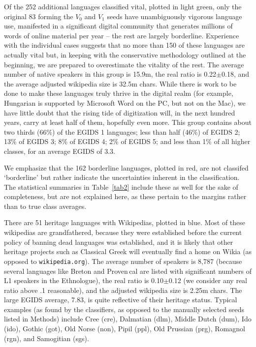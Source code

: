 \documentclass[10pt]{article}
\begin{document}
Of the 252 additional languages classified vital, plotted in light green, only
the original 83 forming the $V_0$ and $V_1$ seeds have unambiguously vigorous
language use, manifested in a significant digital community that generates
millions of words of online material per year -- the rest are largely
borderline. Experience with the individual cases suggests that no more than
150 of these languages are actually vital but, in keeping with the
conservative methodology outlined at the beginning, we are prepared to
overestimate the vitality of the rest.  The average number of native speakers
in this group is 15.9m, the real ratio is 0.22$\pm$0.18, and the average
adjusted wikipedia size is 32.5m chars.  While there is work to be done to
make these languages truly thrive in the digital realm (for example, Hungarian
is supported by Microsoft Word on the PC, but not on the Mac), we have little
doubt that the rising tide of digitization will, in the next hundred years,
carry at least half of them, hopefully even more. This group contains about
two thirds (66\%) of the EGIDS 1 languages; less than half (46\%) of EGIDS 2;
13\% of EGIDS 3; 8\% of EGIDS 4; 2\% of EGIDS 5; and less than 1\% of all
higher classes, for an average EGIDS of 3.3.

	

We emphasize that the 162 borderline languages, plotted in red, are not
classifed `borderline' but rather indicate the uncertainties inherent in the
classification. The statistical summaries in Table~\ref{tab2} include these as well for
the sake of completeness, but are not explained here, as these pertain to the
margins rather than to true class averages. 

There are 51 heritage languages with Wikipedias, plotted in blue.  Most of
these wikipedias are grandfathered, because they were established before the
current policy of banning dead languages was established, and it is likely
that other heritage projects such as Classical Greek will eventually find a
home on Wikia (as opposed to {\tt wikipedia.org}). The average number of
speakers is 8,787 (because several languages like Breton and Proven\,cal are
listed with significant numbers of L1 speakers in the Ethnologue), the real
ratio is 0.10$\pm$0.12 (we consider any real ratio above .1 reasonable), and
the adjusted wikipedia size is 2.25m chars. The large EGIDS average, 7.83, is
quite reflective of their heritage status. Typical examples (as found by the
classifiers, as opposed to the manually selected seeds listed in Methods)
include Cree (cre), Dalmatian (dlm), Middle Dutch (dum), Ido (ido), Gothic
(got), Old Norse (non), Pipil (ppl), Old Prussian (prg), Romagnol (rgn), and
Samogitian (sgs).
\end{document}
